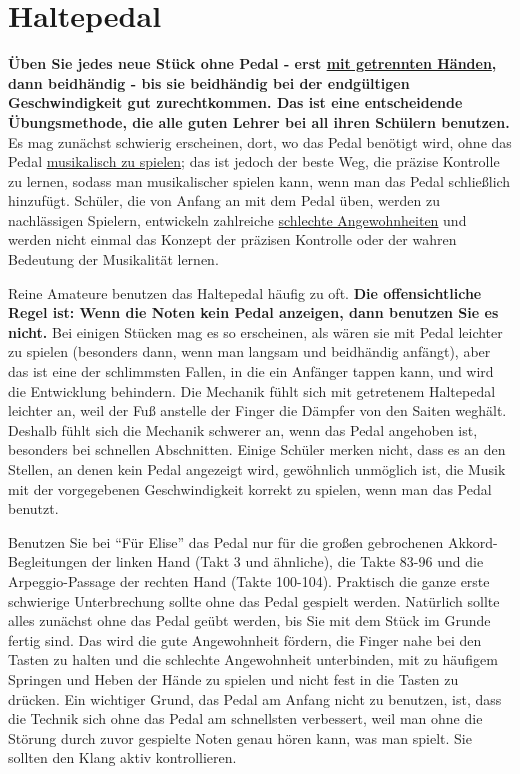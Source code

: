
\section{Haltepedal}
\label{c1ii23}

\textbf{Üben Sie jedes neue Stück ohne Pedal - erst \hyperref[c1ii7]{mit getrennten Händen}, dann beidhändig - bis sie beidhändig bei der endgültigen Geschwindigkeit gut zurechtkommen.
Das ist eine entscheidende Übungsmethode, die alle guten Lehrer bei all ihren Schülern benutzen.}
Es mag zunächst schwierig erscheinen, dort, wo das Pedal benötigt wird, ohne das Pedal \hyperref[c1iii14d]{musikalisch zu spielen};
das ist jedoch der beste Weg, die präzise Kontrolle zu lernen, sodass man musikalischer spielen kann, wenn man das Pedal schließlich hinzufügt.
Schüler, die von Anfang an mit dem Pedal üben, werden zu nachlässigen Spielern, entwickeln zahlreiche \hyperref[c1ii22]{schlechte Angewohnheiten} und werden nicht einmal das Konzept der präzisen Kontrolle oder der wahren Bedeutung der Musikalität lernen.

Reine Amateure benutzen das Haltepedal häufig zu oft.
\textbf{Die offensichtliche Regel ist: Wenn die Noten kein Pedal anzeigen, dann benutzen Sie es nicht.}
Bei einigen Stücken mag es so erscheinen, als wären sie mit Pedal leichter zu spielen (besonders dann, wenn man langsam und beidhändig anfängt), aber das ist eine der schlimmsten Fallen, in die ein Anfänger tappen kann, und wird die Entwicklung behindern.
Die Mechanik fühlt sich mit getretenem Haltepedal leichter an, weil der Fuß anstelle der Finger die Dämpfer von den Saiten weghält.
Deshalb fühlt sich die Mechanik schwerer an, wenn das Pedal angehoben ist, besonders bei schnellen Abschnitten.
Einige Schüler merken nicht, dass es an den Stellen, an denen kein Pedal angezeigt wird, gewöhnlich unmöglich ist, die Musik mit der vorgegebenen Geschwindigkeit korrekt zu spielen, wenn man das Pedal benutzt.

Benutzen Sie bei \enquote{Für Elise} das Pedal nur für die großen gebrochenen Akkord-Begleitungen der linken Hand (Takt 3 und ähnliche), die Takte 83-96 und die Arpeggio-Passage der rechten Hand (Takte 100-104).
Praktisch die ganze erste schwierige Unterbrechung sollte ohne das Pedal gespielt werden.
Natürlich sollte alles zunächst ohne das Pedal geübt werden, bis Sie mit dem Stück im Grunde fertig sind.
Das wird die gute Angewohnheit fördern, die Finger nahe bei den Tasten zu halten und die schlechte Angewohnheit unterbinden, mit zu häufigem Springen und Heben der Hände zu spielen und nicht fest in die Tasten zu drücken.
Ein wichtiger Grund, das Pedal am Anfang nicht zu benutzen, ist, dass die Technik sich ohne das Pedal am schnellsten verbessert, weil man ohne die Störung durch zuvor gespielte Noten genau hören kann, was man spielt.
Sie sollten den Klang aktiv kontrollieren.

